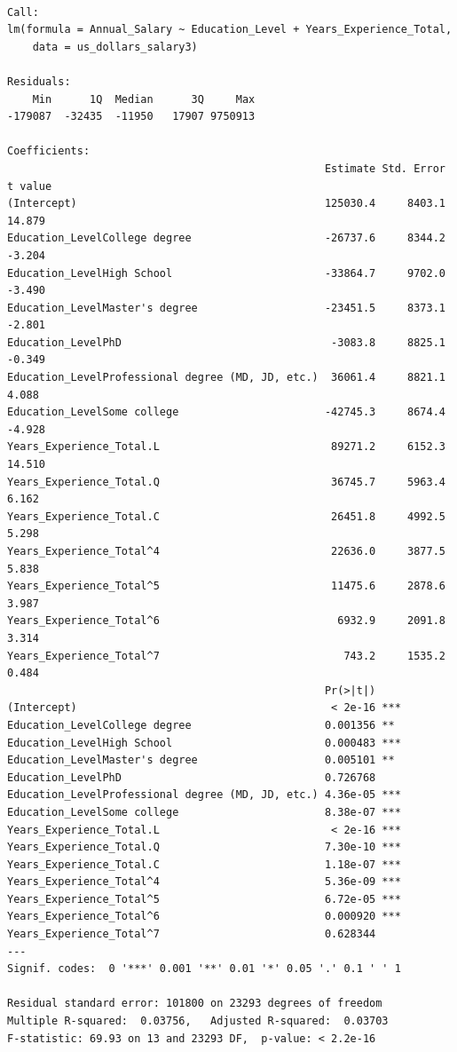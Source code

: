 \documentclass[
  letterpaper,
  DIV=11,
  numbers=noendperiod]{scrartcl}
\begin{document}
\begin{verbatim}

Call:
lm(formula = Annual_Salary ~ Education_Level + Years_Experience_Total, 
    data = us_dollars_salary3)

Residuals:
    Min      1Q  Median      3Q     Max 
-179087  -32435  -11950   17907 9750913 

Coefficients:
                                                  Estimate Std. Error t value
(Intercept)                                       125030.4     8403.1  14.879
Education_LevelCollege degree                     -26737.6     8344.2  -3.204
Education_LevelHigh School                        -33864.7     9702.0  -3.490
Education_LevelMaster's degree                    -23451.5     8373.1  -2.801
Education_LevelPhD                                 -3083.8     8825.1  -0.349
Education_LevelProfessional degree (MD, JD, etc.)  36061.4     8821.1   4.088
Education_LevelSome college                       -42745.3     8674.4  -4.928
Years_Experience_Total.L                           89271.2     6152.3  14.510
Years_Experience_Total.Q                           36745.7     5963.4   6.162
Years_Experience_Total.C                           26451.8     4992.5   5.298
Years_Experience_Total^4                           22636.0     3877.5   5.838
Years_Experience_Total^5                           11475.6     2878.6   3.987
Years_Experience_Total^6                            6932.9     2091.8   3.314
Years_Experience_Total^7                             743.2     1535.2   0.484
                                                  Pr(>|t|)    
(Intercept)                                        < 2e-16 ***
Education_LevelCollege degree                     0.001356 ** 
Education_LevelHigh School                        0.000483 ***
Education_LevelMaster's degree                    0.005101 ** 
Education_LevelPhD                                0.726768    
Education_LevelProfessional degree (MD, JD, etc.) 4.36e-05 ***
Education_LevelSome college                       8.38e-07 ***
Years_Experience_Total.L                           < 2e-16 ***
Years_Experience_Total.Q                          7.30e-10 ***
Years_Experience_Total.C                          1.18e-07 ***
Years_Experience_Total^4                          5.36e-09 ***
Years_Experience_Total^5                          6.72e-05 ***
Years_Experience_Total^6                          0.000920 ***
Years_Experience_Total^7                          0.628344    
---
Signif. codes:  0 '***' 0.001 '**' 0.01 '*' 0.05 '.' 0.1 ' ' 1

Residual standard error: 101800 on 23293 degrees of freedom
Multiple R-squared:  0.03756,   Adjusted R-squared:  0.03703 
F-statistic: 69.93 on 13 and 23293 DF,  p-value: < 2.2e-16
\end{verbatim}
\end{document}
